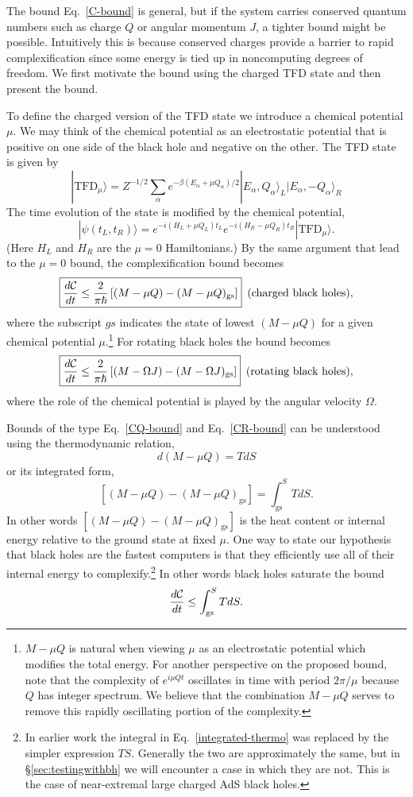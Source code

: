 \documentclass[12pt]{article}
\numberwithin{equation}{section}
\newcommand{\beq}{\begin{equation}}
\newcommand{\eeq}{\end{equation}}
\newcommand{\be}{\begin{equation}}
\newcommand{\ee}{\end{equation}}
\def\CC{{\cal C}}
\newcommand{\ket}[1]{| #1 \rangle }
\begin{document}
The bound Eq.~\ref{C-bound} is general, but if the system carries conserved quantum numbers such as charge $Q$ or angular momentum $J$, a tighter bound might be possible. Intuitively this is because conserved charges provide a barrier to rapid complexification since some energy is tied up in noncomputing degrees of freedom. We first motivate the bound using the charged TFD state and then present the bound.

To define the charged version of the TFD state we introduce a chemical potential $\mu$. We may think of the chemical potential as an electrostatic potential that is positive on one side of the black hole and negative on the other. The TFD state is given by
\beq
| \textrm{TFD}_{\mu} \rangle = Z^{-1/2} \sum_\alpha e^{-{\beta (E_\alpha +\mu Q_\alpha     )}/{2} } \ket{E_\alpha, Q_\alpha }_L\ket{E_\alpha, -Q_\alpha}_R
\label{TFDQ}
\eeq
The time evolution of the state is modified by the chemical potential,
\beq
\ket{\psi(t_L,t_R)} = e^{-i (H_L + \mu Q_L)t_L }  e^{-i (H_R - \mu Q_R)t_R }
| \textrm{TFD}_{\mu} \rangle .
\eeq
(Here $H_L$ and $H_R$ are the $\mu = 0$ Hamiltonians.)
By the same argument that lead to the $\mu =0$ bound, the complexification bound becomes
\beq
\boxed{\frac{d\CC}{dt} \leq  \frac{2}{\pi \hbar} \left[(M - \mu Q) - (M - \mu Q)_{\text{gs}}\right]} \,\,\, \text{(charged black holes),}
\label{CQ-bound}
\eeq
where the subscript $gs$ indicates the state of lowest $(M-\mu Q)$ for a given chemical potential $\mu$.\footnote{$M-\mu Q$ is natural when viewing $\mu$ as an electrostatic potential which modifies the total energy. For another perspective on the proposed bound, note that the complexity of $e^{i  \mu Q t}$ oscillates in time with period $2\pi/\mu$ because $Q$ has integer spectrum. We believe that the combination $M - \mu Q$ serves to remove this rapidly oscillating portion of the complexity.} For rotating black holes the bound becomes
\beq
\boxed{\frac{d\CC}{dt} \leq  \frac{2}{\pi \hbar} \left[(M - \Omega J) - (M - \Omega J)_{\text{gs}}\right]}  \,\,\, \text{(rotating black holes)},
\label{CR-bound}
\eeq
where the role of the chemical potential is played by the angular velocity
$\Omega$.

Bounds of the type Eq.~\ref{CQ-bound} and Eq.~\ref{CR-bound} can be understood using the thermodynamic relation,
\be
d(M-\mu Q) = TdS
\label{thermo-relation}
\ee
or its integrated form,
\be
\left[(M - \mu Q) - (M - \mu Q)_{\text{gs}}\right]= \int_\textrm{gs}^S T dS.
\label{integrated-thermo}
\ee
In other words $\left[(M - \mu Q) - (M - \mu Q)_{\text{gs}}\right]$ is the heat content or internal energy relative to the ground state at fixed $\mu.$  One way to state our hypothesis that black holes are the fastest computers is that they efficiently use all of their internal energy to complexify.\footnote{In earlier work the integral in Eq.~\ref{integrated-thermo} was replaced by the simpler expression $TS.$ Generally the two are approximately the same, but in \S\ref{sec:testingwithbh} we will encounter a case in which they are not. This is the case of near-extremal large charged AdS black holes.} In other words black holes saturate the bound
\be
\frac{d\CC}{dt} \leq \int_\textrm{gs}^S T dS.
\ee
\end{document}
